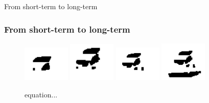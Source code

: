 \documentclass{beamer}
\begin{document}
\begin{frame}{From short-term to long-term}
	\frametitle{From short-term to long-term}
	\begin{figure}[b]
		\centering
		\includegraphics[width=0.2\textwidth]{images/frame1.png}
		\includegraphics[width=0.2\textwidth]{images/frame2.png}
		\includegraphics[width=0.2\textwidth]{images/frame3.png}
		\includegraphics[width=0.2\textwidth]{images/frame4.png}
		\label{figur}\caption{equation...}
	\end{figure}
\end{frame}
\end{document}
